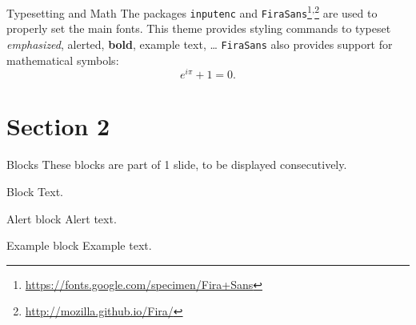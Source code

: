 \documentclass{beamer}
\begin{document}

\begin{frame}{Typesetting and Math}
	The packages \texttt{inputenc} and \texttt{FiraSans}\footnote{\url{https://fonts.google.com/specimen/Fira+Sans}}\textsuperscript{,}\footnote{\url{http://mozilla.github.io/Fira/}} are used to properly set the main fonts.
	\vfill
	This theme provides styling commands to typeset \emph{emphasized}, \alert{alerted}, \textbf{bold}, \textcolor{example}{example text}, \dots
	\vfill
	\texttt{FiraSans} also provides support for mathematical symbols:
	\begin{equation*}
		e^{i\pi} + 1 = 0.
	\end{equation*}
\end{frame}


\section{Section 2}


\begin{frame}{Blocks}
	These blocks are part of 1 slide, to be displayed consecutively.
	\begin{block}{Block}
		Text.
	\end{block}
	\pause %
	\begin{alertblock}{Alert block}
		Alert \alert{text}.
	\end{alertblock}
	\pause %
	\begin{exampleblock}{Example block}
		Example \textcolor{example}{text}.
	\end{exampleblock}
\end{frame}

\end{document}
